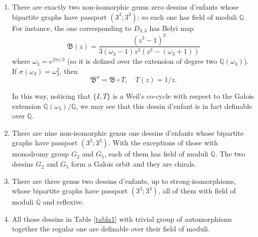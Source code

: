 \documentclass[12pt]{amsart}
\theoremstyle{remark}
\begin{document}
\begin{enumerate}
\item There are exactly two non-isomorphic genus zero dessins d'enfants whose bipartite graphs have passport $(3^3;3^3)$; so each one has field of moduli ${\mathbb Q}$. For instance, the one corresponding to $D_{3,3}$ has Belyi map 
$${\mathfrak B}(z)=\frac{(z^{3}-1)^{3}}{3(\omega_{3}-1)z^{3}(z^{3}-(\omega_{3}+1))}$$
where $\omega_{3}=e^{2 \pi i/3}$ (so it is defined over the extension of degree two ${\mathbb Q}(\omega_{3})$). If $\sigma(\omega_{3})=\omega_{3}^{2}$, then 
$${\mathfrak B}^{\sigma}={\mathfrak B} \circ T, \quad T(z)=1/z.$$

In this way, noticing that $\{I,T\}$ is a Weil's co-cycle with respect to the Galois extension ${\mathbb Q}(\omega_{3})/{\mathbb Q}$, we may see that this dessin d'enfant is in fact definable over ${\mathbb Q}$. 

\item There are nine non-isomorphic genus one dessins d'enfants whose bipartite graphs have passport $(3^3;3^3)$. With the exceptions of those with monodromy group $G_{2}$ and $G_{5}$, each of them has field of moduli ${\mathbb Q}$.
The two dessins $G_{2}$ and $G_{5}$ form a Galois orbit and they are chirals.

\item There are three genus two dessins d'enfants, up to strong-isomorphisms, whose bipartite graphs have passport $(3^3;3^3)$, all of them with field of moduli ${\mathbb Q}$ and reflexive. 

\item All those dessins in Table \ref{tabla1} with trivial group of automorphisms together the regular one are definable over their field of moduli. 

\end{enumerate}
\end{document}
